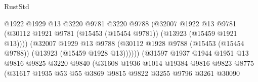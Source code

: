 \begin{lexlean}{RustStd}
\begin{coremodule}
                                          @1922
                                          @1929
                                          @13
                                          @3220
                                          @9781
                                          @3220
                                          @9788
                                          (@32007
                                            @1922
                                            @13
                                            @9781
                                            (@30112
                                              @1921
                                              @9781
                                              (@15453 (@15454 @9781))
                                              (@13923 (@15459 @1921 @13))))
                                          (@32007
                                            @1929
                                            @13
                                            @9788
                                            (@30112
                                              @1928
                                              @9788
                                              (@15453 (@15454 @9788))
                                              (@13923 (@15459 @1928 @13))))))
                                      (@31597
                                        @1937
                                        @1944
                                        @1951
                                        @13
                                        @9816
                                        @9825
                                        @3220
                                        @9840
                                        (@31608
                                          @1936
                                          @1014
                                          @19384
                                          @9816
                                          @9823
                                          @8775
                                          (@31617
                                            @1935
                                            @53
                                            @55
                                            @3869
                                            @9815
                                            @9822
                                            @3255
                                            @9796
                                            @3261
                                            @30090

\end{coremodule}
\end{lexlean}

